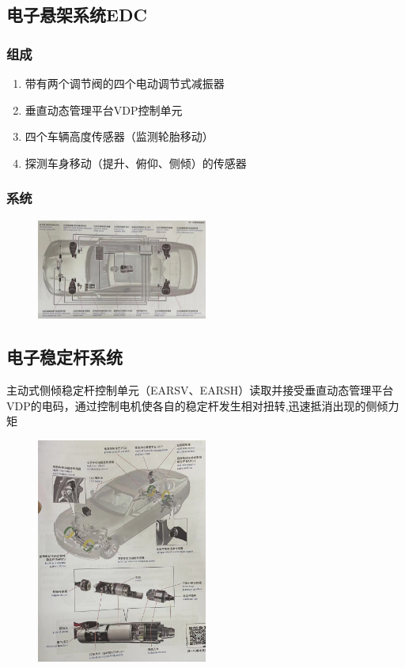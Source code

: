 \subsection{电子悬架系统EDC}
	\subsubsection{组成}
		\begin{enumerate}
			\item 带有两个调节阀的四个电动调节式减振器
			
			\item 垂直动态管理平台VDP控制单元
			
			\item 四个车辆高度传感器（监测轮胎移动）
			
			\item 探测车身移动（提升、俯仰、侧倾）的传感器
		\end{enumerate}
	\subsubsection{系统}
		\begin{figure}[htbp]
			\centering
			\includegraphics[width=0.5\textwidth]{5-13}
		\end{figure}
\subsection{电子稳定杆系统}
	主动式侧倾稳定杆控制单元（EARSV、EARSH）读取并接受垂直动态管理平台VDP的电码，通过控制电机使各自的稳定杆发生相对扭转,迅速抵消出现的侧倾力矩
	\begin{figure}[htbp]
		\centering
		\includegraphics[width=0.5\textwidth]{5-14}
	\end{figure}

